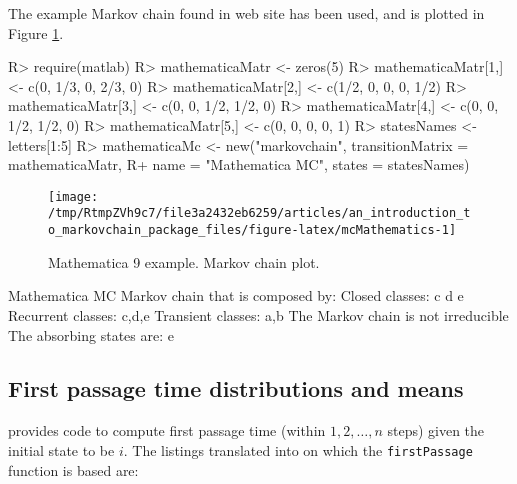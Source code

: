 \documentclass[
  nojss]{jss}
\begin{document}
The example Markov chain found in  web site \citep{mathematica9MarkovChain} has
been used, and is plotted in Figure \ref{fig:mcMathematics}.

\begin{CodeChunk}

\begin{CodeInput}
R> require(matlab)
R> mathematicaMatr <- zeros(5)
R> mathematicaMatr[1,] <- c(0, 1/3, 0, 2/3, 0)
R> mathematicaMatr[2,] <- c(1/2, 0, 0, 0, 1/2)
R> mathematicaMatr[3,] <- c(0, 0, 1/2, 1/2, 0)
R> mathematicaMatr[4,] <- c(0, 0, 1/2, 1/2, 0)
R> mathematicaMatr[5,] <- c(0, 0, 0, 0, 1)
R> statesNames <- letters[1:5]
R> mathematicaMc <- new("markovchain", transitionMatrix = mathematicaMatr,
R+                    name = "Mathematica MC", states = statesNames)
\end{CodeInput}
\end{CodeChunk}

\begin{CodeChunk}
\begin{figure}

{\centering \texttt{[image: /tmp/RtmpZVh9c7/file3a2432eb6259/articles/an\_introduction\_to\_markovchain\_package\_files/figure-latex/mcMathematics-1]} 

}

\caption[Mathematica 9 example]{Mathematica 9 example. Markov chain plot.}\label{fig:mcMathematics}
\end{figure}
\end{CodeChunk}

\begin{CodeChunk}

\begin{CodeOutput}
Mathematica MC  Markov chain that is composed by: 
Closed classes: 
c d 
e 
Recurrent classes: 
{c,d},{e}
Transient classes: 
{a,b}
The Markov chain is not irreducible 
The absorbing states are: e
\end{CodeOutput}
\end{CodeChunk}

\hypertarget{first-passage-time-distributions-and-means}{%
\subsection{First passage time distributions and means}\label{first-passage-time-distributions-and-means}}

\cite{renaldoMatlab} provides code to compute first passage time (within \(1,2,\ldots, n\) steps) given the initial state to be \(i\). The  listings translated into  on which the \texttt{firstPassage} function is based are:
\end{document}
